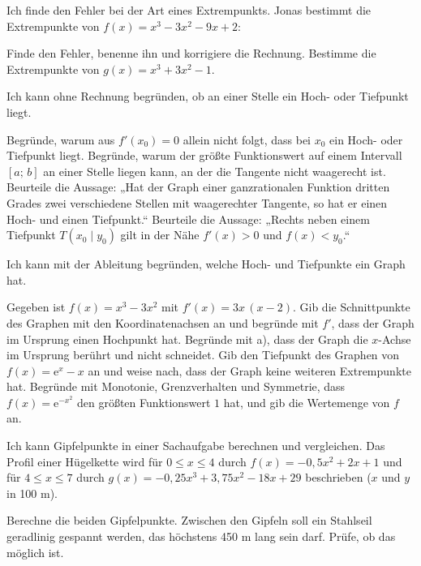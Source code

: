 \begin{aufgabe}{Ich finde den Fehler bei der Art eines Extrempunkts. Jonas bestimmt die Extrempunkte von $f(x) = x^3 - 3x^2 - 9x + 2$:}
\begin{teile}
\teil Finde den Fehler, benenne ihn und korrigiere die Rechnung.
\teil Bestimme die Extrempunkte von $g(x) = x^3 + 3x^2 - 1$.
\end{teile}
\end{aufgabe}

\begin{aufgabe}{Ich kann ohne Rechnung begründen, ob an einer Stelle ein Hoch- oder Tiefpunkt liegt.}
\begin{teile}
\teil Begründe, warum aus $f'(x_0) = 0$ allein nicht folgt, dass bei $x_0$ ein Hoch- oder Tiefpunkt liegt.
\teil Begründe, warum der größte Funktionswert auf einem Intervall $[a;\,b]$ an einer Stelle liegen kann, an der die Tangente nicht waagerecht ist.
\teil Beurteile die Aussage: „Hat der Graph einer ganzrationalen Funktion dritten Grades zwei verschiedene Stellen mit waagerechter Tangente, so hat er einen Hoch- und einen Tiefpunkt.“
\teil Beurteile die Aussage: „Rechts neben einem Tiefpunkt $T(x_0 \mid y_0)$ gilt in der Nähe $f'(x) > 0$ und $f(x) < y_0$.“
\end{teile}
\end{aufgabe}

\begin{aufgabe}{Ich kann mit der Ableitung begründen, welche Hoch- und Tiefpunkte ein Graph hat.}
\begin{teile}
\teil Gegeben ist $f(x) = x^3 - 3x^2$ mit $f'(x) = 3x\,(x - 2)$. Gib die Schnittpunkte des Graphen mit den Koordinatenachsen an und begründe mit $f'$, dass der Graph im Ursprung einen Hochpunkt hat.
\teil Begründe mit a), dass der Graph die $x$-Achse im Ursprung berührt und nicht schneidet.
\teil Gib den Tiefpunkt des Graphen von $f(x) = \mathrm{e}^{x} - x$ an und weise nach, dass der Graph keine weiteren Extrempunkte hat.
\teil Begründe mit Monotonie, Grenzverhalten und Symmetrie, dass $f(x) = \mathrm{e}^{-x^2}$ den größten Funktionswert $1$ hat, und gib die Wertemenge von $f$ an.
\end{teile}
\end{aufgabe}

\begin{aufgabe}{Ich kann Gipfelpunkte in einer Sachaufgabe berechnen und vergleichen. Das Profil einer Hügelkette wird für $0 \le x \le 4$ durch $f(x) = -0{,}5x^2 + 2x + 1$ und für $4 \le x \le 7$ durch $g(x) = -0{,}25x^3 + 3{,}75x^2 - 18x + 29$ beschrieben ($x$ und $y$ in 100 m).}
\begin{teile}
\teil Berechne die beiden Gipfelpunkte.
\teil Zwischen den Gipfeln soll ein Stahlseil geradlinig gespannt werden, das höchstens 450 m lang sein darf. Prüfe, ob das möglich ist.
\end{teile}
\end{aufgabe}

